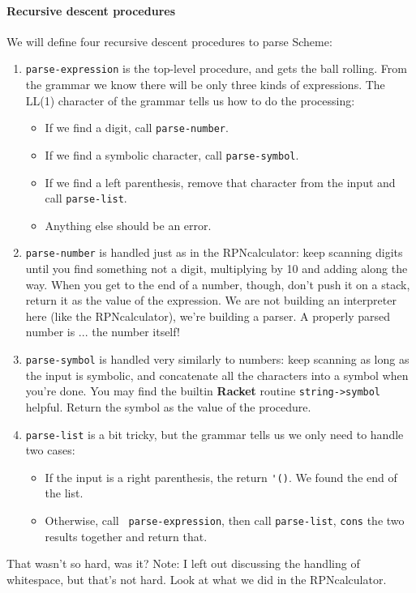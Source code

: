 \documentclass{article}
\begin{document}
\paragraph{Recursive descent procedures}

We will define four recursive descent procedures to parse Scheme:
\begin{enumerate}

\item{\tt parse-expression} is the top-level procedure, and gets the ball
rolling. From the grammar we know there will be only three kinds of
expressions.  The LL(1) character of the grammar tells us how
to do the processing:
\begin{itemize}
\item If we find a digit, call {\tt parse-number}.
\item If we find a symbolic character, call {\tt parse-symbol}.
\item
  If we find a left parenthesis, remove that character from the
  input and call {\tt parse-list}.
\item
  Anything else should be an error.
\end{itemize}

\item{\tt parse-number} is handled
 just as in the RPNcalculator: keep scanning digits until
you find something not a digit, multiplying by 10 and adding along the
way.  When you get to the end of a number, though, don't push it on a
stack, return it as the value of the expression.  We are not building
an interpreter here (like the RPNcalculator), we're building  a
parser.  A properly parsed number is ... the number itself!

\item{\tt parse-symbol} is handled very similarly to numbers:  keep
scanning as long as the input is symbolic, and concatenate all the
characters into a symbol when you're done.  You may find the builtin
{\bf Racket} routine {\tt string->symbol} helpful.  Return the symbol
as the value of the procedure.

\item{\tt parse-list} is a bit tricky, but
  the grammar tells us we only need to
handle two cases:
  \begin{itemize}
    \item
 If the input is a right
 parenthesis, the return \verb|'()|.  We found the end of the list.
\item
 Otherwise, call {\tt
  parse-expression}, then call {\tt parse-list}, {\tt cons}
the two results together and return that.
\end{itemize}
\end{enumerate}
That wasn't so hard, was it?  Note:  I left out discussing the
handling of whitespace, but that's not hard.  Look at what we did in
the RPNcalculator.
\end{document}
